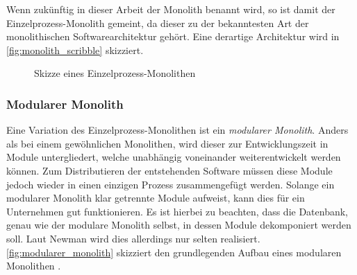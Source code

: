     Wenn zukünftig in dieser Arbeit der Monolith benannt wird, so ist damit der Einzelprozess-Monolith gemeint, da dieser zu der bekanntesten Art der monolithischen Softwarearchitektur gehört. Eine derartige Architektur wird in \autoref{fig:monolith_scribble} skizziert.
    
    \begin{figure}[!t]
        \vspace{.02\textheight}
        \centering
        \caption{Skizze eines Einzelprozess-Monolithen \parencite{newman2019monolith}}
        \label{fig:monolith_scribble}
    \end{figure}

    \subsubsection{Modularer Monolith}
    Eine Variation des Einzelprozess-Monolithen ist ein \emph{modularer Monolith}. Anders als bei einem gewöhnlichen Monolithen, wird dieser zur Entwicklungszeit in Module untergliedert, welche unabhängig voneinander weiterentwickelt werden können. Zum Distributieren der entstehenden Software müssen diese Module jedoch wieder in einen einzigen Prozess zusammengefügt werden. Solange ein modularer Monolith klar getrennte Module aufweist, kann dies für ein Unternehmen gut funktionieren. Es ist hierbei zu beachten, dass die Datenbank, genau wie der modulare Monolith selbst, in dessen Module dekomponiert werden soll. Laut Newman wird dies allerdings nur selten realisiert. \autoref{fig:modularer_monolith} skizziert den grundlegenden Aufbau eines modularen Monolithen \parencite{newman2019monolith}.
    
